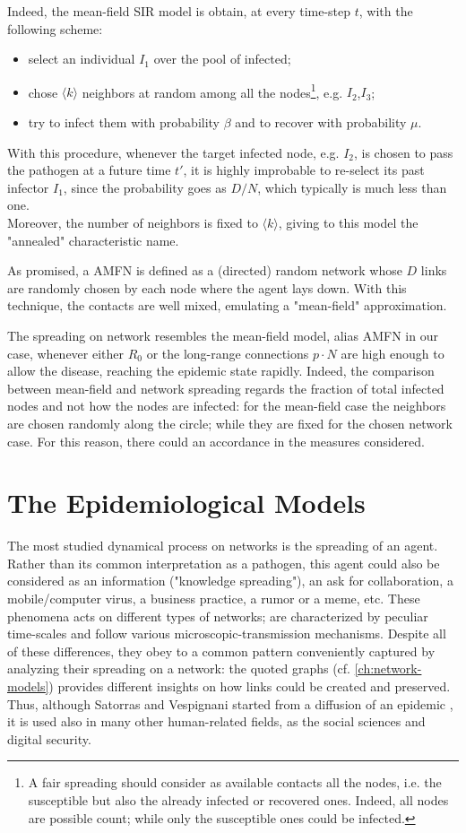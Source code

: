 \documentclass[a4paper,10pt,twoside]{book} %
\theoremstyle{definition}
\begin{document}
Indeed, the mean-field SIR model is obtain, at every time-step $t$, with the following scheme: 
\begin{itemize}
	\item select an individual $I_1$ over the pool of infected;
	\item chose $\langle k \rangle$ neighbors at random among all the nodes\footnote{A fair spreading should consider as available contacts all the nodes, i.e. the susceptible but also the already infected or recovered ones. Indeed, all nodes are possible count; while only the susceptible ones could be infected.}, e.g. $I_2$,$I_3$;
	\item try to infect them with probability $\beta$ and to recover with probability $\mu$.
\end{itemize}
With this procedure, whenever the target infected node, e.g. $I_2$, is chosen to pass the pathogen at a future time $t'$, it is highly improbable to re-select its past infector $I_1$, since the probability goes as $D/N$, which typically is much less than one. 
\\Moreover, the number of neighbors is fixed to $\langle k \rangle$, giving to this model the "annealed" characteristic name.

As promised, a AMFN is defined as a (directed) random network whose $D$ links are randomly chosen by each node where the agent lays down. With this technique, the contacts are well mixed, emulating a "mean-field" approximation.

The spreading on network resembles the mean-field model, alias AMFN in our case, whenever either $R_0$ or the long-range connections $p \cdot N$ are high enough to allow the disease, reaching the epidemic state rapidly. Indeed, the comparison between mean-field and network spreading regards the fraction of total infected nodes and not how the nodes are infected: for the mean-field case the neighbors are chosen randomly along the circle; while they are fixed for the chosen network case. For this reason, there could an accordance in the measures considered.



\chapter{The Epidemiological Models}
\label{ch:sir-models}	
The most studied dynamical process on networks is the spreading of an agent. Rather than its common interpretation as a pathogen, this agent could also be considered as an information ("knowledge spreading"), an ask for collaboration, a mobile/computer virus, a business practice, a rumor or a meme, etc. These phenomena acts on different types of networks; are characterized by peculiar time-scales and follow various microscopic-transmission mechanisms. Despite all of these differences, they obey to a common pattern conveniently captured by analyzing their spreading on a network: the quoted graphs (cf. \autoref{ch:network-models}) provides different insights on how links could be created and preserved. Thus, although Satorras and Vespignani started from a diffusion of an epidemic \cite{VespignaniSatorras2001Epidemic}, it is used also in many other human-related fields, as the social sciences and digital security.
\end{document}
